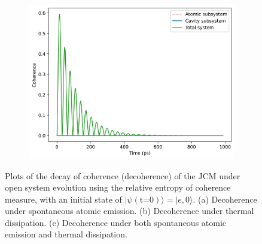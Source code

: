 \documentclass[11pt]{article}
\begin{document}
\begin{figure}[H]
    \vspace{0.5cm}
    
    \begin{subfigure}{0.45\textwidth}
        \centering
        \includegraphics[width=\linewidth]{Research Project/Code/results/JCM/OQS_Coh_Both.png}
        \caption{}
        \label{fig:JCM_OQS_Coh_Both}
    \end{subfigure}
    \hfill
    \caption{Plots of the decay of coherence (decoherence) of the JCM under open system evolution using the relative entropy of coherence measure, with an initial state of $|\psi (\text{t=0})\rangle = |e, 0\rangle$. (a) Decoherence under spontaneous atomic emission. (b) Decoherence under thermal dissipation. (c) Decoherence under both spontaneous atomic emission and thermal dissipation.}
    \label{fig:JCM_OQS_Coh}
\end{figure}
\end{document}

